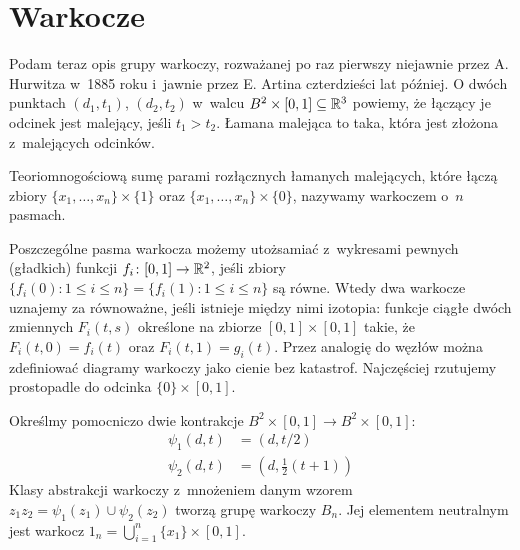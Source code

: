 \section{Warkocze} %
\label{sec:braid}
Podam teraz opis grupy warkoczy, rozważanej po raz pierwszy niejawnie przez A. Hurwitza w~1885 roku i~jawnie przez E. Artina czterdzieści lat później.
O dwóch punktach $(d_1, t_1)$, $(d_2, t_2)$ w~walcu $B^2 \times [0, 1] \subseteq \mathbb R^3$ powiemy, że łączący je odcinek jest malejący, jeśli $t_1 > t_2$.
Łamana malejąca to taka, która jest złożona z~malejących odcinków.

\begin{definition}[warkocz]
    \label{braid_def}
    Teoriomnogościową sumę parami rozłącznych łamanych malejących, które łączą zbiory $\{x_1, \ldots, x_n\} \times \{1\}$ oraz $\{x_1, \ldots, x_n\} \times \{0\}$, nazywamy warkoczem o~$n$ pasmach.
\end{definition}

Poszczególne pasma warkocza możemy utożsamiać z~wykresami pewnych (gładkich) funkcji $f_i \colon [0, 1] \to \mathbb R^2$, jeśli zbiory $\{f_i(0) : 1 \le i \le n\} = \{f_i(1) : 1 \le i \le n\}$ są równe.
Wtedy dwa warkocze uznajemy za równoważne, jeśli istnieje między nimi izotopia: funkcje ciągłe dwóch zmiennych $F_i(t, s)$ określone na zbiorze $[0,1] \times [0,1]$ takie, że $F_i(t,0)= f_i(t)$ oraz $F_i(t, 1) = g_i(t)$.
Przez analogię do węzłów można zdefiniować diagramy warkoczy jako cienie bez katastrof.
Najczęściej rzutujemy prostopadle do odcinka $\{0\} \times [0, 1]$.

\begin{definition}
    Określmy pomocniczo dwie kontrakcje $B^2 \times [0,1] \to B^2 \times [0,1]$:
    \begin{align*}
        \psi_1(d, t)&  = (d, t/2) \\
        \psi_2(d, t)&  = (d, \frac12 (t+1))
    \end{align*}
    Klasy abstrakcji warkoczy z~mnożeniem danym wzorem $z_1z_2 = \psi_1(z_1) \cup \psi_2(z_2)$ tworzą grupę warkoczy $B_n$.
    Jej elementem neutralnym jest warkocz $1_n = \bigcup_{i = 1}^n \{x_1\} \times [0,1]$.
\end{definition}

